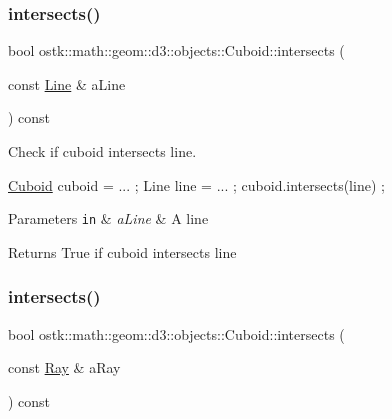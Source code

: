 \subsubsection{\texorpdfstring{intersects()}{intersects()}\hspace{0.1cm}{\footnotesize\ttfamily [3/9]}}
{\footnotesize\ttfamily bool ostk\+::math\+::geom\+::d3\+::objects\+::\+Cuboid\+::intersects (\begin{DoxyParamCaption}\item[{const \hyperlink{classostk_1_1math_1_1geom_1_1d3_1_1objects_1_1_line}{Line} \&}]{a\+Line }\end{DoxyParamCaption}) const}



Check if cuboid intersects line. 


\begin{DoxyCode}
\hyperlink{classostk_1_1math_1_1geom_1_1d3_1_1objects_1_1_cuboid_a1da071d7cbb0a694348628f098f77c5b}{Cuboid} cuboid = ... ;
Line line = ... ;
cuboid.intersects(line) ;
\end{DoxyCode}



\begin{DoxyParams}[1]{Parameters}
\mbox{\tt in}  & {\em a\+Line} & A line \\
\hline
\end{DoxyParams}
\begin{DoxyReturn}{Returns}
True if cuboid intersects line 
\end{DoxyReturn}
\mbox{\label{classostk_1_1math_1_1geom_1_1d3_1_1objects_1_1_cuboid_adfa6039ef6cf8e800af4927ababbc34f}} 
\subsubsection{\texorpdfstring{intersects()}{intersects()}\hspace{0.1cm}{\footnotesize\ttfamily [4/9]}}
{\footnotesize\ttfamily bool ostk\+::math\+::geom\+::d3\+::objects\+::\+Cuboid\+::intersects (\begin{DoxyParamCaption}\item[{const \hyperlink{classostk_1_1math_1_1geom_1_1d3_1_1objects_1_1_ray}{Ray} \&}]{a\+Ray }\end{DoxyParamCaption}) const}



